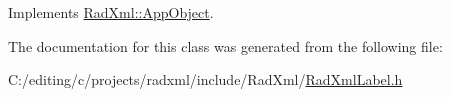 Implements \hyperlink{class_rad_xml_1_1_app_object_a677e0af301973343665699f6d07f2018}{Rad\-Xml\-::\-App\-Object}.



The documentation for this class was generated from the following file\-:\begin{DoxyCompactItemize}
\item 
C\-:/editing/c/projects/radxml/include/\-Rad\-Xml/\hyperlink{_rad_xml_label_8h}{Rad\-Xml\-Label.\-h}\end{DoxyCompactItemize}
